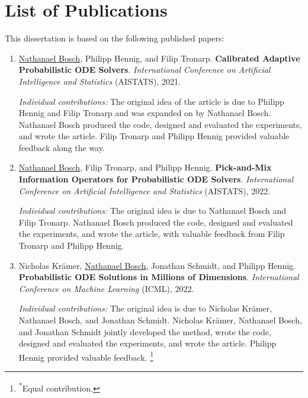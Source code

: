 \documentclass{mimosis}
\begin{document}
\chapter*{\hypertarget{listofpublications}{List of Publications}}
\label{sec:org45c46e3}

This dissertation is based on the following published papers:

\begin{enumerate}[label=\Roman*]
\itemsep1.25em

\item
\hypertarget{capos}{
\underline{Nathanael Bosch}, Philipp Hennig, and Filip Tronarp.
\textbf{Calibrated Adaptive Probabilistic ODE Solvers}.
\emph{International Conference on Artificial Intelligence and Statistics}
(AISTATS),
2021.
}
\par \emph{Individual contributions:}
The original idea of the article is due to Philipp Hennig and Filip Tronarp and was expanded on by Nathanael Bosch.
Nathanael Bosch produced the code, designed and evaluated the experiments, and wrote the article.
Filip Tronarp and Philipp Hennig provided valuable feedback along the way.

\item
\hypertarget{pickandmix}{
\underline{Nathanael Bosch}, Filip Tronarp, and Philipp Hennig.
\textbf{Pick-and-Mix Information Operators for Probabilistic ODE Solvers}.
\emph{International Conference on Artificial Intelligence and Statistics}
(AISTATS),
2022.
}
\par \emph{Individual contributions:}
The original idea is due to Nathanael Bosch and Filip Tronarp.
Nathanael Bosch produced the code, designed and evaluated the experiments, and wrote the article, with valuable feedback from Filip Tronarp and Philipp Hennig.

\item
\hypertarget{highdim}{
Nicholas Krämer\equalc{}, \underline{Nathanael Bosch}\equalc{}, Jonathan Schmidt\equalc{}, and Philipp Hennig.
\textbf{Probabilistic ODE Solutions in Millions of Dimensions}.
\emph{International Conference on Machine Learning}
(ICML),
2022.
}
\par \emph{Individual contributions:}
The original idea is due to Nicholas Krämer, Nathanael Bosch, and Jonathan Schmidt.
Nicholas Krämer, Nathanael Bosch, and Jonathan Schmidt jointly developed the method, wrote the code, designed and evaluated the experiments, and wrote the article.
Philipp Hennig provided valuable feedback.
{\let\thefootnote\relax\footnote{\textsuperscript{*}Equal contribution.}}


\end{enumerate}
\end{document}
